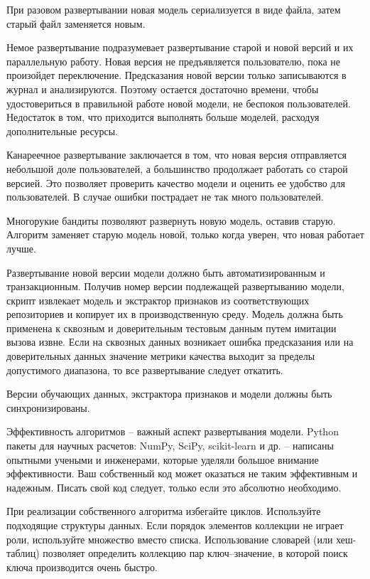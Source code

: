 При разовом развертывании новая модель сериализуется в виде файла, затем старый файл заменяется новым.

Немое развертывание подразумевает развертывание старой и новой версий и их параллельную работу. Новая версия не предъявляется пользователю, пока не произойдет переключение. Предсказания новой версии только записываются в журнал и анализируются. Поэтому остается достаточно времени, чтобы удостовериться в правильной работе новой модели, не беспокоя пользователей. Недостаток в том, что приходится выполнять больше моделей, расходуя дополнительные ресурсы.

Канареечное развертывание заключается в том, что новая версия отправляется небольшой доле пользователей, а большинство продолжает работать со старой версией. Это позволяет проверить качество модели и оценить ее удобство для пользователей. В случае ошибки пострадает не так много пользователей.

Многорукие бандиты позволяют развернуть новую модель, оставив старую. Алгоритм заменяет старую модель новой, только когда уверен, что новая работает лучше.

Развертывание новой версии модели должно быть автоматизированным и транзакционным. Получив номер версии подлежащей развертыванию модели, скрипт извлекает модель и экстрактор признаков из соответствующих репозиториев и копирует их в производственную среду. Модель должна быть применена к сквозным и доверительным тестовым данным путем имитации вызова извне. Если на сквозных данных возникает ошибка предсказания или на доверительных данных значение метрики качества выходит за пределы допустимого диапазона, то все развертывание следует откатить.

Версии обучающих данных, экстрактора признаков и модели должны быть синхронизированы.

Эффективность алгоритмов {--} важный аспект развертывания модели.	Python пакеты для научных расчетов: NumPy, SciPy, scikit-learn и др. {--} написаны опытными учеными и инженерами, которые уделяли большое внимание эффективности. Ваш собственный код может оказаться не таким эффективным и надежным. Писать свой код следует, только если это абсолютно необходимо.

При реализации собственного алгоритма избегайте циклов. Используйте подходящие структуры данных. Если порядок элементов коллекции не играет роли, используйте множество вместо списка. Использование словарей (или хеш-таблиц) позволяет определить коллекцию пар ключ–значение, в которой поиск ключа производится очень быстро.

